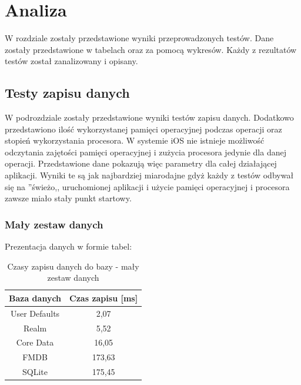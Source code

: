 \section{Analiza}

W rozdziale zostały przedstawione wyniki przeprowadzonych testów. Dane zostały przedstawione w tabelach oraz za pomocą wykresów. Każdy z rezultatów testów został zanalizowany i opisany.

\subsection{Testy zapisu danych}
W podrozdziale zostały przedstawione wyniki testów zapisu danych. Dodatkowo przedstawiono ilość wykorzystanej pamięci operacyjnej podczas operacji oraz stopień wykorzystania procesora. W systemie iOS nie istnieje możliwość odczytania zajętości pamięci operacyjnej i zużycia procesora jedynie dla danej operacji. Przedstawione dane pokazują więc parametry dla całej działającej aplikacji. Wyniki te są jak najbardziej miarodajne gdyż każdy z testów odbywał się na ''świeżo,, uruchomionej aplikacji i użycie pamięci operacyjnej i procesora zawsze miało stały punkt startowy. 

\subsubsection{Mały zestaw danych}

Prezentacja danych w formie tabel: 

\begin{table}[h]
\centering
\caption{Czasy zapisu danych do bazy - mały zestaw danych}
\label{tab: small-save-time-table}
\begin{tabular}{|c|c|}
\hline
Baza danych   & Czas zapisu [ms] \\ \hline
User Defaults & 2,07             \\ \hline
Realm         & 5,52             \\ \hline
Core Data     & 16,05            \\ \hline
FMDB          & 173,63           \\ \hline
SQLite        & 175,45           \\ \hline
\end{tabular}
\end{table}

